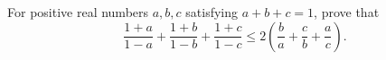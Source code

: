 For positive real numbers $a,b,c$ satisfying $a+b+c=1$, prove that \[\frac{1+a}{1-a}+\frac{1+b}{1-b}+\frac{1+c}{1-c} \leq 2\left(\frac{b}{a}+\frac{c}{b}+\frac{a}{c}\right).\]
